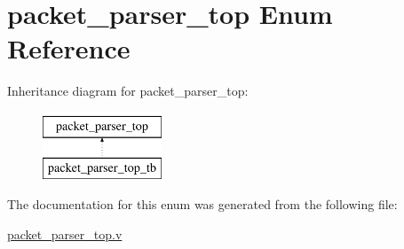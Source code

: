 \hypertarget{enumpacket__parser__top}{}\section{packet\+\_\+parser\+\_\+top Enum Reference}
\label{enumpacket__parser__top}
Inheritance diagram for packet\+\_\+parser\+\_\+top\+:\begin{figure}[H]
\begin{center}
\leavevmode
\includegraphics[height=2.000000cm]{enumpacket__parser__top}
\end{center}
\end{figure}


The documentation for this enum was generated from the following file\+:\begin{DoxyCompactItemize}
\item 
\mbox{\hyperlink{packet__parser__top_8v}{packet\+\_\+parser\+\_\+top.\+v}}\end{DoxyCompactItemize}
